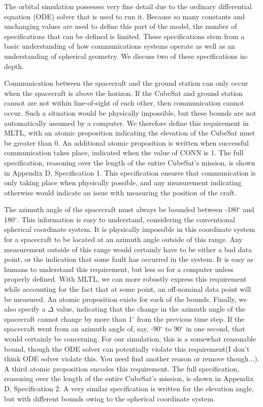 \documentclass[conf]{new-aiaa}
\begin{document}
The orbital simulation possesses very fine detail due to the ordinary differential equation (ODE) solver that is used to run it. Because so many constants and unchanging values are used to define this part of the model, the number of specifications that can be defined is limited. These specifications stem from a basic understanding of how communications systems operate as well as an understanding of spherical geometry. We discuss two of these specifications in-depth. 

Communication between the spacecraft and the ground station can only occur when the spacecraft is above the horizon. If the CubeSat and ground station cannot are not within line-of-sight of each other, then communication cannot occur. Such a situation would be physically impossible, but these bounds are not automatically assumed by a computer. We therefore define this requirement in MLTL, with an atomic proposition indicating the elevation of the CubeSat must be greater than 0. An additional atomic proposition is written when successful communication takes place, indicated when the value of CONN is 1. The full specification, reasoning over the length of the entire CubeSat's mission, is shown in Appendix D, Specification 1. This specification ensures that communication is only taking place when physically possible, and any measurement indicating otherwise would indicate an issue with measuring the position of the craft.

The azimuth angle of the spacecraft must always be bounded between -180$^{\circ}$ and 180$^{\circ}$. This information is easy to understand, considering the conventional spherical coordinate system. It is physically impossible in this coordinate system for a spacecraft to be located at an azimuth angle outside of this range. Any measurement outside of this range would certainly have to be either a bad data point, or the indication that some fault has occurred in the system. It is easy as humans to understand this requirement, but less so for a computer unless properly defined. With MLTL, we can more robustly express this requirement while accounting for the fact that at some point, an off-nominal data point will be measured. An atomic proposition exists for each of the bounds. Finally, we also specify a $\Delta$ value, indicating that the change in the azimuth angle of the spacecraft cannot change by more than 1$^{\circ}$ from the previous time step. If the spacecraft went from an azimuth angle of, say, -90$^{\circ}$ to 90$^{\circ}$ in one second, that would certainly be concerning. For our simulation, this is a somewhat reasonable bound, though the ODE solver can potentially violate this requirement(I don't think ODE solver violate this. You need find another reason or remove though...). A third atomic proposition encodes this requirement. The full specification, reasoning over the length of the entire CubeSat's mission, is shown in Appendix D, Specification 2. A very similar specification is written for the elevation angle, but with different bounds owing to the spherical coordinate system.
\end{document}
